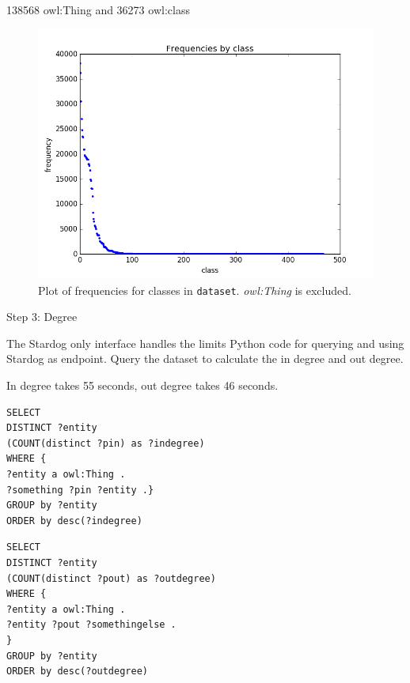 \documentclass[runningheads,a4paper]{../../StyleFiles/llncs}
\begin{document}
138568 owl:Thing and 36273 owl:class

\begin{figure}[h]
	\centering
	\includegraphics[width=1\textwidth]{img/dataset_frequency.png}
	\caption{Plot of frequencies for classes in \texttt{dataset}. \textit{owl:Thing} is excluded.}
	\label{fig:frequency}
\end{figure}

Step 3: Degree

The Stardog only interface handles the limits 
Python code for querying and using Stardog as endpoint. 
Query the dataset to calculate the in degree and out degree.

In degree takes 55 seconds, out degree takes 46 seconds.

\begin{lstlisting}[captionpos=b, caption=SPARQL query for calculating in degree of entities, label=lst:sparql, basicstyle=\ttfamily\small,frame=bt]
SELECT
DISTINCT ?entity
(COUNT(distinct ?pin) as ?indegree)
WHERE { 
?entity a owl:Thing .
?something ?pin ?entity .}
GROUP by ?entity
ORDER by desc(?indegree)
\end{lstlisting}

\begin{lstlisting}[captionpos=b, caption=SPARQL query for calculating out degree of entities, label=lst:sparql, basicstyle=\ttfamily\small,frame=bt]
SELECT
DISTINCT ?entity
(COUNT(distinct ?pout) as ?outdegree)
WHERE { 
?entity a owl:Thing .
?entity ?pout ?somethingelse .
}
GROUP by ?entity
ORDER by desc(?outdegree)
\end{lstlisting}
\end{document}
